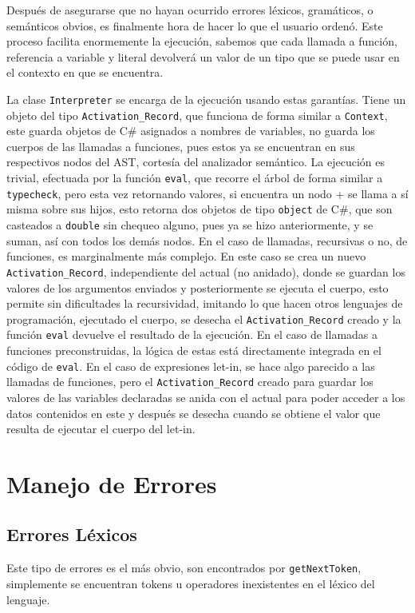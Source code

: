 \documentclass{article}
\begin{document}
Después de asegurarse que no hayan ocurrido errores léxicos, gramáticos, o semánticos obvios, es finalmente hora de hacer lo que el usuario ordenó. Este proceso facilita enormemente la ejecución, sabemos que cada llamada a función, referencia a variable y literal devolverá un valor de un tipo que se puede usar en el contexto en que se encuentra.

La clase \texttt{Interpreter} se encarga de la ejecución usando estas garantías. Tiene un objeto del tipo \texttt{Activation\_Record}, que funciona de forma similar a \texttt{Context}, este guarda objetos de C\# asignados a nombres de variables, no guarda los cuerpos de las llamadas a funciones, pues estos ya se encuentran en sus respectivos nodos del AST, cortesía del analizador semántico. La ejecución es trivial, efectuada por la función \texttt{eval}, que recorre el árbol de forma similar a \texttt{typecheck}, pero esta vez retornando valores, si encuentra un nodo + se llama a sí misma sobre sus hijos, esto retorna dos objetos de tipo \texttt{object} de C\#, que son casteados a \texttt{double} sin chequeo alguno, pues ya se hizo anteriormente, y se suman, así con todos los demás nodos. En el caso de llamadas, recursivas o no, de funciones, es marginalmente más complejo. En este caso se crea un nuevo \texttt{Activation\_Record}, independiente del actual (no anidado), donde se guardan los valores de los argumentos enviados y posteriormente se ejecuta el cuerpo, esto permite sin dificultades la recursividad, imitando lo que hacen otros lenguajes de programación, ejecutado el cuerpo, se desecha el \texttt{Activation\_Record} creado y la función \texttt{eval} devuelve el resultado de la ejecución. En el caso de llamadas a funciones preconstruidas, la lógica de estas está directamente integrada en el código de \texttt{eval}. En el caso de expresiones let-in, se hace algo parecido a las llamadas de funciones, pero el \texttt{Activation\_Record} creado para guardar los valores de las variables declaradas se anida con el actual para poder acceder a los datos contenidos en este y después se desecha cuando se obtiene el valor que resulta de ejecutar el cuerpo del let-in.

\newpage

\section{Manejo de Errores}

\subsection{Errores Léxicos}
Este tipo de errores es el más obvio, son encontrados por \texttt{getNextToken}, simplemente se encuentran tokens u operadores inexistentes en el léxico del lenguaje.
\end{document}
